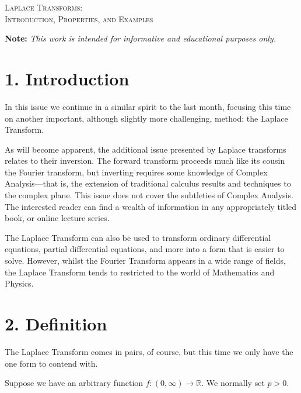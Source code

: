 \documentclass[11pt]{article}
\begin{document}

\begin{tcolorbox}
\begin{center}
    \large
    \textsc{Laplace Transforms: \\ Introduction, Properties, and Examples}
\end{center}
\end{tcolorbox}

\begin{center}
\textbf{Note:} \textit{This work is intended for informative and educational purposes only.}
\end{center}

\section*{1. Introduction}
In this issue we continue in a similar spirit to the last month, focusing this time on another important, although slightly more challenging, method: the Laplace Transform.

As will become apparent, the additional issue presented by Laplace transforms relates to their inversion. The forward transform proceeds much like its cousin the Fourier transform, but inverting requires some knowledge of Complex Analysis––that is, the extension of traditional calculus results and techniques to the complex plane. This issue does not cover the subtleties of Complex Analysis. The interested reader can find a wealth of information in any appropriately titled book, or online lecture series.

The Laplace Transform can also be used to transform ordinary differential equations, partial differential equations, and more into a form that is easier to solve. However, whilst the Fourier Transform appears in a wide range of fields, the Laplace Transform tends to restricted to the world of Mathematics and Physics. 

\section*{2. Definition}
The Laplace Transform comes in pairs, of course, but this time we only have the one form to contend with.

Suppose we have an arbitrary function $f: (0,\infty) \longrightarrow \mathbb{R}$. We normally set $p>0$.
\end{document}
